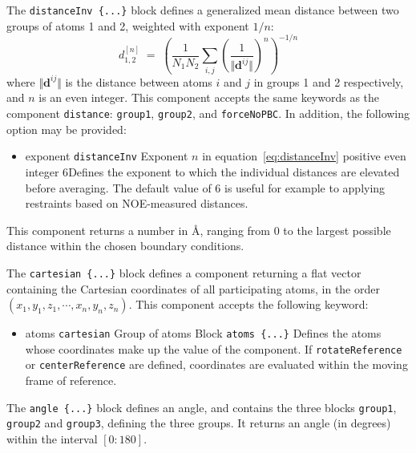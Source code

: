 The \texttt{distanceInv~\{...\}} block defines a generalized mean distance between two groups of atoms 1 and 2, weighted with exponent $1/n$:
\begin{equation}
  \label{eq:distanceInv}
  d_{\mathrm{1,2}}^{[n]} \; = \;   \left(\frac{1}{N_{\mathrm{1}}N_{\mathrm{2}}}\sum_{i,j} \left(\frac{1}{\Vert\mathbf{d}^{ij}\Vert}\right)^{n} \right)^{-1/n}
\end{equation}
where $\Vert\mathbf{d}^{ij}\Vert$ is the distance between atoms $i$ and $j$ in groups 1 and 2 respectively, and $n$ is an even integer.
This component accepts the same keywords as the component \texttt{distance}: \texttt{group1}, \texttt{group2}, and \texttt{forceNoPBC}.  In addition, the following option may be provided:
\begin{itemize}
\item %
  \keydef
    {exponent}{%
    \texttt{distanceInv}}{%
    Exponent $n$ in equation~\ref{eq:distanceInv}}{%
    positive even integer}{%
    6}{Defines the exponent to which the individual distances are elevated before averaging.  The default value of 6 is useful for example to applying restraints based on NOE-measured distances.}
\end{itemize}
This component returns a number in \AA{}, ranging from $0$ to the largest possible distance within the chosen boundary conditions.


The \texttt{cartesian~\{...\}} block defines a component returning a flat vector containing
the Cartesian coordinates of all participating atoms, in the order
$(x_1, y_1, z_1, \cdots, x_n, y_n, z_n)$.
This component accepts the following keyword:
\begin{itemize}
\item %
  \key
    {atoms}{%
    \texttt{cartesian}}{%
    Group of atoms}{%
    Block \texttt{atoms \{...\}}}{%
    Defines the atoms whose coordinates make up the value of the component.
    If \texttt{rotateReference} or \texttt{centerReference} are defined, coordinates
    are evaluated within the moving frame of reference.}
\end{itemize}


The \texttt{angle~\{...\}} block defines an angle, and contains the
three blocks \texttt{group1}, \texttt{group2} and \texttt{group3}, defining
the three groups.  It returns an angle (in degrees) within the
interval $[0:180]$.


